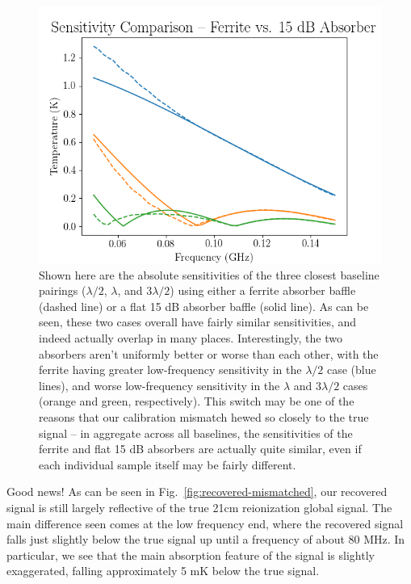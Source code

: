 \begin{figure}
    \begin{center}
    \includegraphics[width=\linewidth]{sensitivity_comparison.png}
    \end{center}
    \caption{
        Shown here are the absolute sensitivities of the three closest baseline 
        pairings ($\lambda/2$, $\lambda$, and $3\lambda/2$) using either a 
        ferrite absorber baffle (dashed line) or a flat 15 dB absorber baffle 
        (solid line). As can be seen, these two cases overall have fairly 
        similar sensitivities, and indeed actually overlap in many places.  
        Interestingly, the two absorbers aren't uniformly better or worse than 
        each other, with the ferrite having greater low-frequency sensitivity 
        in the $\lambda/2$ case (blue lines), and worse low-frequency 
        sensitivity in the $\lambda$ and $3\lambda/2$ cases (orange and green, 
        respectively). This switch may be one of the reasons that our 
        calibration mismatch hewed so closely to the true signal -- in 
        aggregate across all baselines, the sensitivities of the ferrite and 
        flat 15 dB absorbers are actually quite similar, even if each 
        individual sample itself may be fairly different.
    }
    \label{fig:sensitivity-comparison}
\end{figure}

Good news! As can be seen in Fig.~\ref{fig:recovered-mismatched}, our recovered 
signal is still largely reflective of the true 21cm reionization global signal.  
The main difference seen comes at the low frequency end, where the recovered 
signal falls just slightly below the true signal up until a frequency of about 
80 MHz. In particular, we see that the main absorption feature of the signal is 
   slightly exaggerated, falling approximately 5 mK below the true signal.

